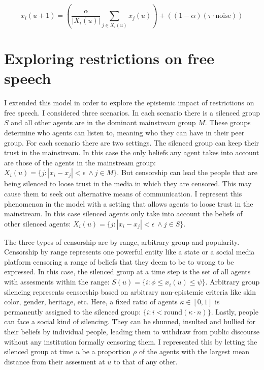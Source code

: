 \documentclass{essay-formal}
\begin{document}
\[ x_i(u + 1) = \left( \frac{\alpha}{|X_i(u)|} \sum_{j \in X_i(u)} x_j(u) \right) + \left( (1-\alpha)(\tau \cdot \text{noise}) \right) \]


\section{Exploring restrictions on free speech}

I extended this model in order to explore the epistemic impact of restrictions on free speech. I considered three scenarios. In each scenario there is a silenced group $S$ and all other agents are in the dominant mainstream group $M$. These groups determine who agents can listen to, meaning who they can have in their peer group. For each scenario there are two settings. The silenced group can keep their trust in the mainstream. In this case the only beliefs any agent takes into account are those of the agents in the mainstream group: $X_i(u) = \{j: |x_i - x_j| < \epsilon\ \wedge j \in M\}$. But censorship can lead the people that are being silenced to loose trust in the media in which they are censored. This may cause them to seek out alternative means of communication. I represent this phenomenon in the model with a setting that allows agents to loose trust in the mainstream. In this case silenced agents only take into account the beliefs of other silenced agents: $X_i(u) = \{j: |x_i - x_j| < \epsilon\ \wedge j \in S\}$.

The three types of censorship are by range, arbitrary group and popularity. Censorship by range represents one powerful entity like a state or a social media platform censoring a range of beliefs that they deem to be to wrong to be expressed. In this case, the silenced group at a time step is the set of all agents with assesments within the range: $S(u) = \{i: \phi \leq x_i(u) \leq \psi \}$. Arbitrary group silencing represents censorship based on arbitrary non-epistemic criteria like skin color, gender, heritage, etc. Here, a fixed ratio of agents $\kappa \in [0, 1]$ is permanently assigned to the silenced group: $\{i: i < \text{round}(\kappa \cdot n)\}$. Lastly, people can face a social kind of silencing. They can be shunned, insulted and bullied for their beliefs by individual people, leading them to withdraw from public discourse without any institution formally censoring them. I represented this by letting the silenced group at time $u$ be a proportion $\rho$ of the agents with the largest mean distance from their assesment at $u$ to that of any other.
\end{document}
